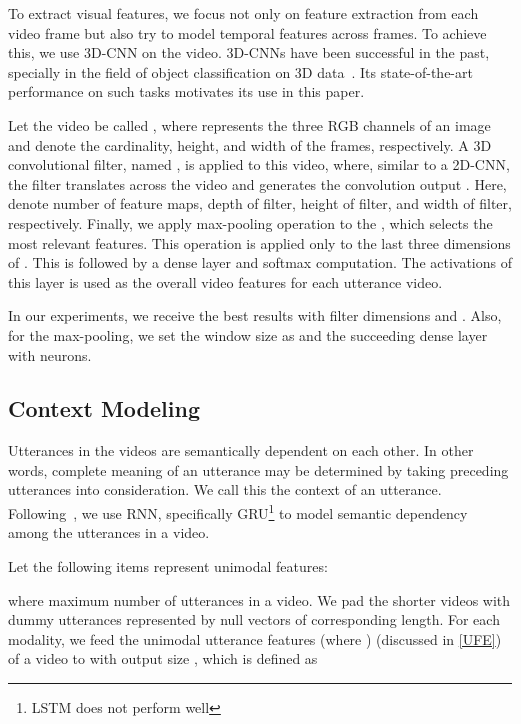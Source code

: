 \documentclass[review]{elsarticle}
\newcommand\?[1]{\hl{#1}}
\begin{document}
To extract visual features, we focus not only on feature extraction from each
video frame but also try to model temporal features across frames. To achieve
this, we use 3D-CNN on the video. 3D-CNNs have been successful in the past,
specially in the field of object classification on 3D data~\citep{ji20133d}. Its
state-of-the-art performance on such tasks motivates its use in this paper.

Let the video be called , where
 represents the three RGB channels of an image and 
denote the cardinality, height, and width of the frames, respectively. A 3D
convolutional filter, named , is applied to this video, where, similar to a 2D-CNN, the
filter translates across the video and generates the convolution output
. Here,  denote number of feature
maps, depth of filter, height of filter, and width of filter,
respectively. Finally, we apply max-pooling operation to the , which
selects the most relevant features. This operation is applied only to the last
three dimensions of . This is followed by a dense layer and softmax
computation. The activations of this layer is used as the overall video features
for each utterance video.

In our experiments, we receive the best results with filter dimensions  and . Also, for the max-pooling, we set the window size as
 and the succeeding dense layer with  neurons.




\subsection{Context Modeling}
\label{sec:context}

Utterances in the videos are semantically dependent on each other. In other
words, complete meaning of an utterance may be determined by taking preceding
utterances into consideration. We call this the context of an utterance.
Following~\citet{porcon}, we use RNN, specifically GRU\footnote{LSTM does not
  perform well} to model semantic
dependency among the utterances in a video.

Let the following items represent unimodal features:

where  maximum number of utterances in a video. We pad the shorter videos
with dummy utterances represented by null vectors of corresponding length.
For each modality, we feed the unimodal utterance features  (where ) (discussed in \cref{UFE}) of a video to  with
output size , which is defined as
\end{document}
